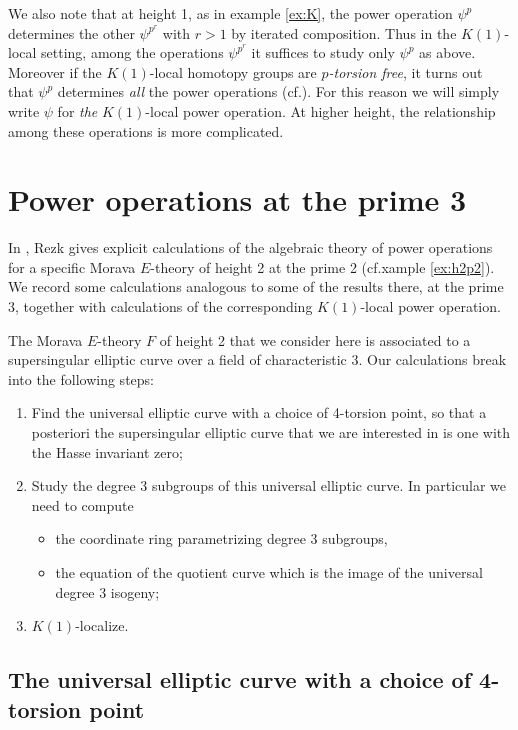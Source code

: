 \documentclass{gtpart}
\theoremstyle{definition}
\theoremstyle{remark}
\newcommand{\cff}[2]{cf.\thinspace{\cite[#1]{#2}}}
\begin{document}
We also note that at height 1, as in example \ref{ex:K}, the power operation 
$\psi^p$ determines the other $\psi^{p^r}$ with $r > 1$ by iterated 
composition.  Thus in the $K(1)$-local setting, among the operations 
$\psi^{p^r}$ it suffices to study only $\psi^p$ as above.  Moreover if the 
$K(1)$-local homotopy groups are {\em $p$-torsion free}, it turns out that 
$\psi^p$ determines {\em all} the power operations (\cff{section 3}{lpo}).  
For this reason we will simply write $\psi$ for {\em the} $K(1)$-local power 
operation.  At higher height, the relationship among these operations is more 
complicated.  


\section{Power operations at the prime 3}
\label{sec:p3}

In \cite{h2p2}, Rezk gives explicit calculations of the algebraic theory of 
power operations for a specific Morava $E$-theory of height 2 at the prime 2 
(cf.xample \ref{ex:h2p2}).  We record some calculations analogous 
to some of the results there, at the prime 3, together with calculations of 
the corresponding $K(1)$-local power operation.  

The Morava $E$-theory $F$ of height 2 that we consider here is associated to 
a supersingular elliptic curve over a field of characteristic 3.  Our 
calculations break into the following steps: 
\begin{enumerate}
 \item Find the universal elliptic curve with a choice of 4-torsion  point, so 
 that a posteriori the supersingular elliptic curve that we are interested in 
 is one with the Hasse invariant zero; 
 \item Study the degree 3 subgroups of this universal elliptic curve.  In 
 particular we need to compute 
 \begin{itemize}
  \item the coordinate ring parametrizing degree 3 subgroups, 
  \item the equation of the quotient curve which is the image of the universal 
  degree 3 isogeny; 
 \end{itemize}
 \item $K(1)$-localize.  
\end{enumerate}


\subsection{The universal elliptic curve with a choice of 4-torsion point}
\label{subsec:step1}
\end{document}

